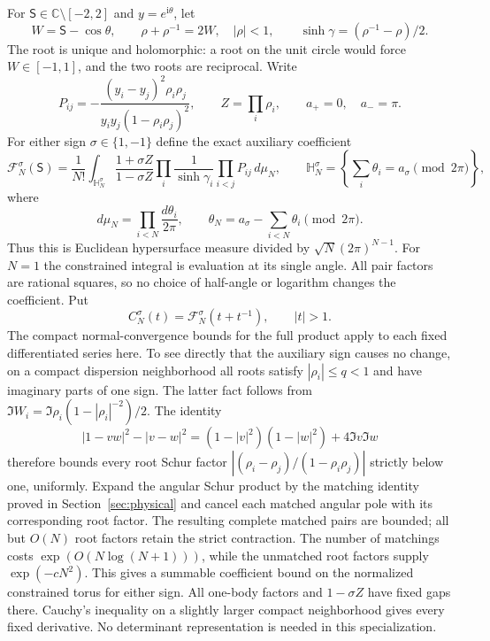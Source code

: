\documentclass[11pt]{article}
\numberwithin{equation}{section}
\theoremstyle{definition}
\newcommand{\C}{\mathbb C}
\newcommand{\ii}{\mathrm i}
\begin{document}
For $\mathsf S\in\C\setminus[-2,2]$ and $y=e^{\ii\theta}$, let
\[
 W=\mathsf S-\cos\theta,\qquad
 \rho+\rho^{-1}=2W,\quad |\rho|<1,\qquad
 \sinh\gamma=(\rho^{-1}-\rho)/2.
\]
The root is unique and holomorphic: a root on the unit circle would
force $W\in[-1,1]$, and the two roots are reciprocal.  Write
\[
 P_{ij}=-\frac{(y_i-y_j)^2\rho_i\rho_j}
                  {y_i y_j(1-\rho_i\rho_j)^2},\qquad
 Z=\prod_i\rho_i,
 \qquad a_+=0,\quad a_-=\pi.
\]
For either sign $\sigma\in\{1,-1\}$ define the exact auxiliary coefficient
\begin{equation}\label{eq:iso-product}
 \mathcal F_N^\sigma(\mathsf S)
 =\frac1{N!}\int_{\mathbb H_N^\sigma}
       \frac{1+\sigma Z}{1-\sigma Z}
       \prod_i\frac1{\sinh\gamma_i}\prod_{i<j}P_{ij}\,d\mu_N,
 \qquad
 \mathbb H_N^\sigma=\left\{\sum_i\theta_i=a_\sigma
                                    \pmod{2\pi}\right\},
\end{equation}
where
\[
 d\mu_N=\prod_{i<N}\frac{d\theta_i}{2\pi},\qquad
 \theta_N=a_\sigma-\sum_{i<N}\theta_i\pmod{2\pi}.
\]
Thus this is Euclidean hypersurface measure divided by
$\sqrt N(2\pi)^{N-1}$.  For $N=1$ the constrained integral is evaluation
at its single angle.  All pair factors are rational squares, so no
choice of half-angle or logarithm changes the coefficient.  Put
\begin{equation}\label{eq:iso-exterior-coefficients}
 C_N^\sigma(t)=\mathcal F_N^\sigma(t+t^{-1}),\qquad |t|>1.
\end{equation}
The compact normal-convergence bounds for the full product apply to
each fixed differentiated series here.  To see directly that the
auxiliary sign causes no change, on a compact dispersion neighborhood
all roots satisfy $|\rho_i|\le q<1$ and have imaginary parts of one
sign.  The latter fact follows from
$\Im W_i=\Im\rho_i(1-|\rho_i|^{-2})/2$.
The identity
\[
 |1-vw|^2-|v-w|^2
   =(1-|v|^2)(1-|w|^2)+4\Im v\Im w
\]
therefore bounds every root Schur factor
$|(\rho_i-\rho_j)/(1-\rho_i\rho_j)|$ strictly below one, uniformly.
Expand the angular Schur product by the matching identity proved
in Section~\ref{sec:physical} and cancel each matched angular pole
with its corresponding root factor.  The resulting complete matched
pairs are bounded; all but $O(N)$ root factors retain the strict
contraction.  The number of matchings costs
$\exp(O(N\log(N+1)))$, while the unmatched root factors supply
$\exp(-cN^2)$.  This gives a summable coefficient bound on the
normalized constrained torus for either sign.  All one-body factors
and $1-\sigma Z$ have fixed gaps there.  Cauchy's inequality on a
slightly larger compact neighborhood gives every fixed derivative.
No determinant representation is needed in this specialization.
\end{document}
